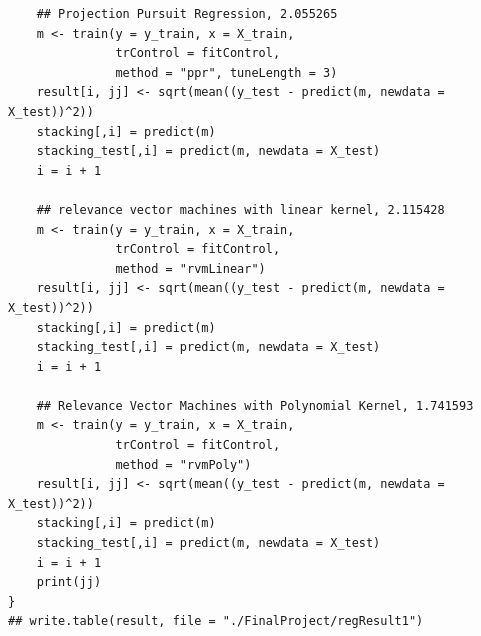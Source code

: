 \documentclass[11pt,oneside,a4paper]{article}
\begin{document}
\begin{verbatim}
    ## Projection Pursuit Regression, 2.055265
    m <- train(y = y_train, x = X_train,
               trControl = fitControl,
               method = "ppr", tuneLength = 3)
    result[i, jj] <- sqrt(mean((y_test - predict(m, newdata = X_test))^2))
    stacking[,i] = predict(m)
    stacking_test[,i] = predict(m, newdata = X_test)
    i = i + 1
    
    ## relevance vector machines with linear kernel, 2.115428
    m <- train(y = y_train, x = X_train,
               trControl = fitControl,
               method = "rvmLinear")
    result[i, jj] <- sqrt(mean((y_test - predict(m, newdata = X_test))^2))
    stacking[,i] = predict(m)
    stacking_test[,i] = predict(m, newdata = X_test)
    i = i + 1
    
    ## Relevance Vector Machines with Polynomial Kernel, 1.741593
    m <- train(y = y_train, x = X_train,
               trControl = fitControl,
               method = "rvmPoly")
    result[i, jj] <- sqrt(mean((y_test - predict(m, newdata = X_test))^2))
    stacking[,i] = predict(m)
    stacking_test[,i] = predict(m, newdata = X_test)
    i = i + 1
    print(jj)
}
## write.table(result, file = "./FinalProject/regResult1")
\end{verbatim}
\end{document}
